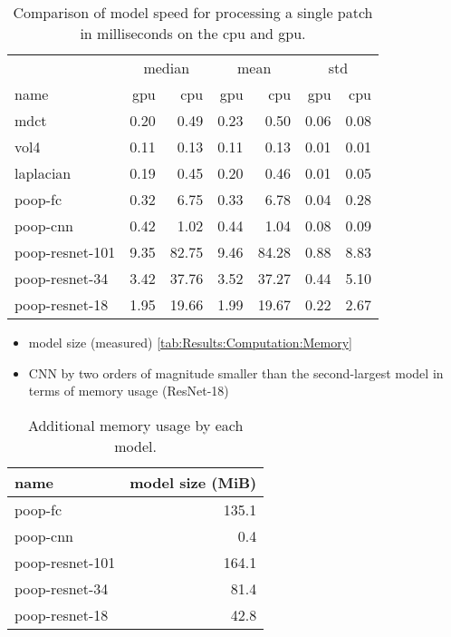 \begin{table}[ht]
    \centering
    \caption{Comparison of model speed for processing a single patch in milliseconds on the \ac{cpu} and \ac{gpu}.}
    \label{tab:Results:Computation:Speed}
    \begin{tabular}{@{\extracolsep{6pt}}lrrrrrr@{}}
        \hline
        \multicolumn{1}{c}{} & \multicolumn{2}{c}{median} & \multicolumn{2}{c}{mean} & \multicolumn{2}{c}{std} \\
        \cline{2-3}\cline{4-5}\cline{6-7}
        name & \acs{gpu} & \acs{cpu} & \acs{gpu} & \acs{cpu} & \acs{gpu} & \acs{cpu} \\
        \hline
        \acs{mdct}                      & 0.20 &  0.49 & 0.23 &  0.50 & 0.06 & 0.08 \\
        \acs{vol4}                      & 0.11 &  0.13 & 0.11 &  0.13 & 0.01 & 0.01 \\
        \acs{laplacian}                 & 0.19 &  0.45 & 0.20 &  0.46 & 0.01 & 0.05 \\
        \hline
        \acs{poop}-\acs{fc}             & 0.32 &  6.75 & 0.33 &  6.78 & 0.04 & 0.28 \\
        \acs{poop}-\acs{cnn}            & 0.42 &  1.02 & 0.44 &  1.04 & 0.08 & 0.09 \\
        \acs{poop}-\acs{resnet}-101     & 9.35 & 82.75 & 9.46 & 84.28 & 0.88 & 8.83 \\
        \acs{poop}-\acs{resnet}-34      & 3.42 & 37.76 & 3.52 & 37.27 & 0.44 & 5.10 \\
        \acs{poop}-\acs{resnet}-18      & 1.95 & 19.66 & 1.99 & 19.67 & 0.22 & 2.67 \\
    \end{tabular}
\end{table}


\begin{itemize}
    \item model size (measured) \autoref{tab:Results:Computation:Memory}
    \item CNN by two orders of magnitude smaller than the second-largest model in terms of memory usage (ResNet-18)
\end{itemize}

\begin{table}[ht]
    \centering
    \caption{Additional memory usage by each model.}
    \label{tab:Results:Computation:Memory}
    \begin{tabular}{lr}
        \hline
        name & model size (MiB) \\
        \hline
        \acs{poop}-\acs{fc}         & 135.1 \\
        \acs{poop}-\acs{cnn}        &   0.4 \\
        \acs{poop}-\acs{resnet}-101 & 164.1 \\
        \acs{poop}-\acs{resnet}-34  &  81.4 \\
        \acs{poop}-\acs{resnet}-18  &  42.8 \\
    \end{tabular}
\end{table}

